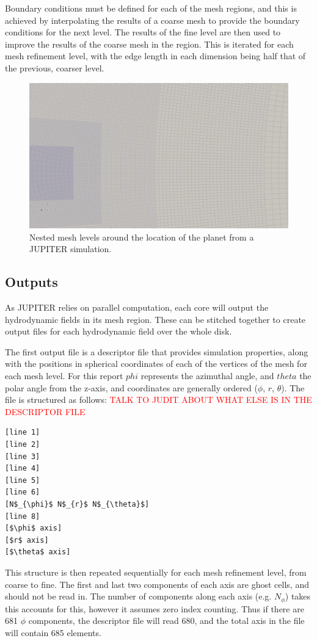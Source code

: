 \documentclass[twocolumn]{aastex62}
\begin{document}
Boundary conditions must be defined for each of the mesh regions, and this is achieved by interpolating the results of a coarse mesh to provide the boundary conditions for the next level. 
The results of the fine level are then used to improve the results of the coarse mesh in the region. 
This is iterated for each mesh refinement level, with the edge length in each dimension being half that of the previous, coarser level. 
\begin{figure}[h]
	\includegraphics[width=\linewidth]{figures/meshface.png}
	\caption{\label{fig:mesh}Nested mesh levels around the location of the planet from a JUPITER simulation.}
\end{figure}
\subsection{Outputs}\label{sec:out}
As JUPITER relies on parallel computation, each core will output the hydrodynamic fields in its mesh region. These can be stitched together to create output files for each hydrodynamic field over the whole disk.

The first output file is a descriptor file that provides simulation properties, along with the positions in spherical coordinates of each of the vertices of the mesh for each mesh level. 
For this report $phi$ represents the azimuthal angle, and $theta$ the polar angle from the z-axis, and coordinates are generally ordered ($\phi$, $r$, $\theta$). 
The file is structured as follows:
\textcolor{red}{TALK TO JUDIT ABOUT WHAT ELSE IS IN THE DESCRIPTOR FILE}
\begin{lstlisting}
[line 1]
[line 2]
[line 3]
[line 4]
[line 5]
[line 6]
[N$_{\phi}$ N$_{r}$ N$_{\theta}$]
[line 8]
[$\phi$ axis]
[$r$ axis]
[$\theta$ axis]
\end{lstlisting}
This structure is then repeated sequentially for each mesh refinement level, from coarse to fine. The first and last two components of each axis are ghost cells, and should not be read in. The number of components along each axis (e.g. $N_{\phi}$) takes this accounts for this, however it assumes zero index counting. Thus if there are 681 $\phi$ components, the descriptor file will read 680, and the total axis in the file will contain 685 elements.
\end{document}
